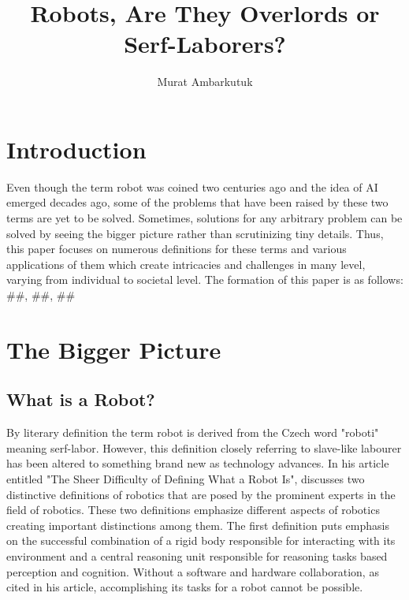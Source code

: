 \documentclass[man]{apa6}
\title{Robots, Are They Overlords or Serf-Laborers?}
\author{Murat Ambarkutuk}
\affiliation{English Language Institute, University of Delaware \\ murata@udel.
edu}
\begin{document}
\maketitle
\section{Introduction}
Even though the term robot was coined two centuries ago and the idea of AI emerged decades ago, some of the problems that have been raised by these two terms are yet to be solved.
Sometimes, solutions for any arbitrary problem can be solved by seeing the bigger picture rather than scrutinizing tiny details.
Thus, this paper focuses on numerous definitions for these terms and various applications of them which create intricacies and challenges in many level, varying from individual to societal level.
The formation of this paper is as follows: \#\#, \#\#, \#\#

\section{The Bigger Picture}
\subsection{What is a Robot?}
\par

By literary definition the term robot is derived from the Czech word "roboti" meaning serf-labor. 
However, this definition closely referring to slave-like labourer has been altered to something brand new as technology advances.
In his article entitled "The Sheer Difficulty of Defining What a Robot Is",  discusses two distinctive definitions of robotics that are posed by the prominent experts in the field of robotics.
These two definitions emphasize different aspects of robotics creating important distinctions among them.
The first definition puts emphasis on the successful combination of a rigid body responsible for interacting with its environment and a central reasoning unit responsible for reasoning tasks based perception and cognition.
Without a software and hardware collaboration, as  cited in his article, accomplishing its tasks for a robot cannot be possible.
\end{document}
